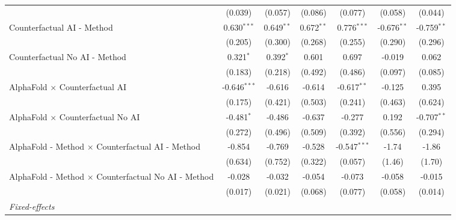 \begin{tabular}{lcccccc}
                                                              & (0.039)        & (0.057)      & (0.086)      & (0.077)        & (0.058)       & (0.044)\\   
   Counterfactual AI - Method                                 & 0.630$^{***}$  & 0.649$^{**}$ & 0.672$^{**}$ & 0.776$^{***}$  & -0.676$^{**}$ & -0.759$^{**}$\\   
                                                              & (0.205)        & (0.300)      & (0.268)      & (0.255)        & (0.290)       & (0.296)\\   
   Counterfactual No AI - Method                              & 0.321$^{*}$    & 0.392$^{*}$  & 0.601        & 0.697          & -0.019        & 0.062\\   
                                                              & (0.183)        & (0.218)      & (0.492)      & (0.486)        & (0.097)       & (0.085)\\   
   AlphaFold $\times$ Counterfactual AI                       & -0.646$^{***}$ & -0.616       & -0.614       & -0.617$^{**}$  & -0.125        & 0.395\\   
                                                              & (0.175)        & (0.421)      & (0.503)      & (0.241)        & (0.463)       & (0.624)\\   
   AlphaFold $\times$ Counterfactual No AI                    & -0.481$^{*}$   & -0.486       & -0.637       & -0.277         & 0.192         & -0.707$^{**}$\\   
                                                              & (0.272)        & (0.496)      & (0.509)      & (0.392)        & (0.556)       & (0.294)\\   
   AlphaFold - Method $\times$ Counterfactual AI - Method     & -0.854         & -0.769       & -0.528       & -0.547$^{***}$ & -1.74         & -1.86\\   
                                                              & (0.634)        & (0.752)      & (0.322)      & (0.057)        & (1.46)        & (1.70)\\   
   AlphaFold - Method $\times$ Counterfactual No AI - Method  & -0.028         & -0.032       & -0.054       & -0.073         & -0.058        & -0.015\\   
                                                              & (0.017)        & (0.021)      & (0.068)      & (0.077)        & (0.058)       & (0.014)\\   
   \midrule
   \emph{Fixed-effects}\\

\end{tabular}
